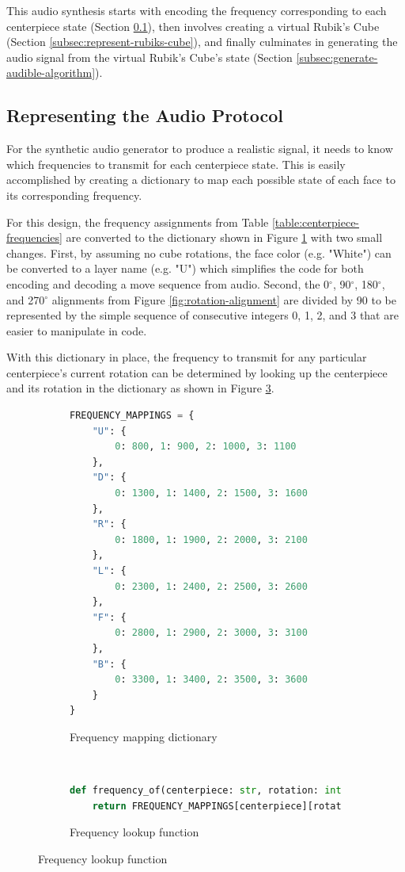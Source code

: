 This audio synthesis starts with encoding the frequency corresponding to each centerpiece state (Section \ref{subsec:represent-audio-protocol}), then involves creating a virtual Rubik's Cube (Section \ref{subsec:represent-rubiks-cube}), and finally culminates in generating the audio signal from the virtual Rubik's Cube's state (Section \ref{subsec:generate-audible-algorithm}).
\newpage
\subsection{Representing the Audio Protocol}
\label{subsec:represent-audio-protocol}
For the synthetic audio generator to produce a realistic signal, it needs to know which frequencies to transmit for each centerpiece state. 
This is easily accomplished by creating a dictionary to map each possible state of each face to its corresponding frequency.

For this design, the frequency assignments from Table \ref{table:centerpiece-frequencies} are converted to the dictionary shown in Figure \ref{fig:code-freq-mapping-dict} with two small changes.
First, by assuming no cube rotations, the face color (e.g. "White") can be converted to a layer name (e.g. "U") which simplifies the code for both encoding and decoding a move sequence from audio.
Second, the 0$^\circ$, 90$^\circ$, 180$^\circ$, and 270$^\circ$ alignments from Figure \ref{fig:rotation-alignment} are divided by 90 to be represented by the simple sequence of consecutive integers 0, 1, 2, and 3 that are easier to manipulate in code.

With this dictionary in place, the frequency to transmit for any particular centerpiece's current rotation can be determined by looking up the centerpiece and its rotation in the dictionary as shown in Figure \ref{fig:code-frequency-of}.

\begin{figure}[h]
\caption{Centerpiece State to Frequency Mapping}
\begin{subfigure}{\textwidth}
\caption{Frequency mapping dictionary}
\label{fig:code-freq-mapping-dict}
\begin{lstlisting}[language=Python]
FREQUENCY_MAPPINGS = {
    "U": {
        0: 800, 1: 900, 2: 1000, 3: 1100
    },
    "D": {
        0: 1300, 1: 1400, 2: 1500, 3: 1600
    },
    "R": {
        0: 1800, 1: 1900, 2: 2000, 3: 2100
    },
    "L": {
        0: 2300, 1: 2400, 2: 2500, 3: 2600
    },
    "F": {
        0: 2800, 1: 2900, 2: 3000, 3: 3100
    },
    "B": {
        0: 3300, 1: 3400, 2: 3500, 3: 3600
    }
}
\end{lstlisting}
\end{subfigure}\\
\begin{subfigure}{\textwidth}
\caption{Frequency lookup function}
\label{fig:code-frequency-of}
\begin{lstlisting}[language=Python, firstnumber=last]
def frequency_of(centerpiece: str, rotation: int) -> float:
    return FREQUENCY_MAPPINGS[centerpiece][rotation]
\end{lstlisting}
\end{subfigure}
\end{figure}


